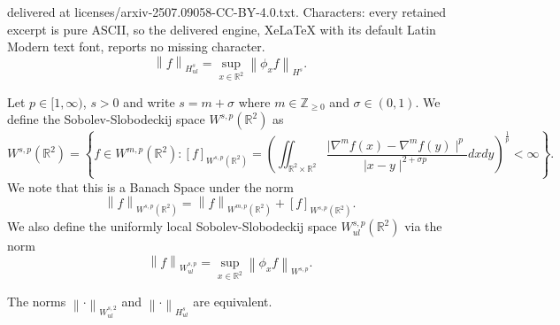 \documentclass[10pt,a4paper]{amsart}
\newcommand{\R}{\mathbb{R}}
\newcommand{\abs}[1]{\mid\!#1\!\mid}
\newcommand{\norm}[2]{\left\lVert#1\right\rVert_{#2}}
\begin{document}
delivered at licenses/arxiv-2507.09058-CC-BY-4.0.txt. Characters: every retained excerpt is pure ASCII, so the delivered engine, XeLaTeX with its default Latin Modern text font, reports no missing character.
\begin{equation}
\label{hsul norm}
\norm{f}{H_{ul}^s} = \sup_{x \in \R^2}\norm{\phi_xf}{H^s}.
\end{equation}

\begin{definition} Let $p \in [1,\infty)$, $s>0$ and write $s=m+\sigma$ where $m \in \mathbb{Z}_{\geq 0}$ and $\sigma \in (0,1)$. We define the Sobolev-Slobodeckij space $W^{s,p}(\R^2)$ as
$$
W^{s,p}(\R^2) = \left\{f \in W^{m,p}(\R^2) : \left[f \right]_{W^{s,p}(\R^2)} = \left(\iint_{\R^2 \times \R^2} \frac{\abs{\nabla^mf(x)-\nabla^mf(y)}^p}{\abs{x-y}^{2+\sigma p}} dx dy\right)^{\frac{1}{p}} <\infty \right\}. 
$$
We note that this is a Banach Space under the norm
$$
\norm{f}{W^{s,p}(\R^2)} = \norm{f}{W^{m,p}(\R^2)} + \left[f \right]_{W^{s,p}(\R^2)}. 
$$
We also define the uniformly local Sobolev-Slobodeckij space $W_{ul}^{s,p}(\R^2)$ via the norm 
\begin{equation}
\label{SSul norm}
\norm{f}{W_{ul}^{s,p}} = \sup_{x\in \R^2} \norm{\phi_xf}{W^{s,p}}.
\end{equation}

\end{definition}

\begin{proposition}
\label{SS equivalent norm}The norms $\norm {\cdot}{W_{ul}^{s,2}}$ and $\norm{\cdot}{H_{ul}^s}$ are equivalent.
\end{proposition}
\end{document}
